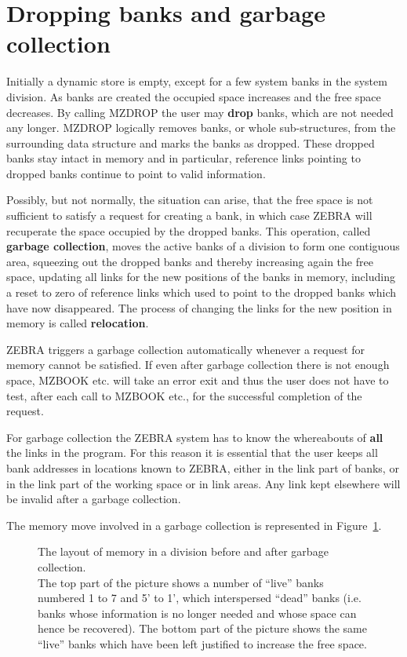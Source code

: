 \section{Dropping banks and garbage collection}
\par
Initially a dynamic store is empty, except for a few system banks in the
system division. As banks are created the occupied space increases and
the free space decreases. By calling MZDROP the user may {\bf drop}
banks, which are not needed any longer. MZDROP logically removes banks,
or whole sub-structures, from the surrounding data structure and marks
the banks as dropped. These dropped banks stay intact in memory and in
particular, reference links pointing to dropped banks continue to point
to valid information.
\par
Possibly, but not normally, the situation can arise, that the free space
is not sufficient to satisfy a request for creating a bank, in which case
ZEBRA will recuperate the space occupied by the dropped banks. This
operation, called {\bf garbage collection}, moves the active
banks of
a division to form one contiguous area, squeezing out the dropped banks
and thereby increasing again the free space, updating all links for the
new positions of the banks in memory, including a reset to zero of
reference links which used to point to the dropped banks which have now
disappeared. The process of changing the links for the new position in
memory is called {\bf relocation}.
\par
ZEBRA triggers a garbage collection automatically whenever a request
for memory cannot be satisfied. If even after garbage collection there
is not enough space, MZBOOK etc. will take an error exit and thus the
user does not have to test, after each call to MZBOOK etc., for the
successful completion of the request.
\par
For garbage collection the ZEBRA system has to know the whereabouts of
{\bf all} the links in the program. For this reason it
is essential that the user keeps all bank addresses in locations known
to ZEBRA, either in the link part of banks, or in the link part of the
working space or in link areas. Any link kept elsewhere will be invalid
after a garbage collection.
\par The memory move involved in a garbage collection is represented in
Figure~\ref{RELOCAT}.
\begin{figure}
\caption[The layout of memory in a division before and after garbage
collection.] {The layout of memory in a division before and after garbage
collection.\\ The top part of the picture
shows a number of ``live'' banks numbered 1 to 7
and 5' to 1', which interspersed ``dead''
banks (i.e. banks whose information is no longer needed and whose space
can hence be recovered).
The bottom part of the picture shows the same ``live''
banks which have been left justified to increase the free space.}
\label{RELOCAT}
\end{figure}
